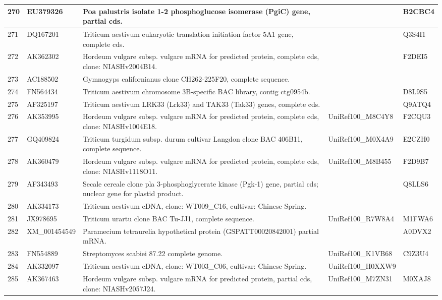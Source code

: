 \documentclass[10.9pt]{article} %
\begin{document}
{\begin{longtable}{|p{1.3cm}|p{1.8cm}|p{6.2cm}|p{3.8cm}|p{2cm}|}
\hline
270 & EU379326 & Poa palustris isolate 1-2 phosphoglucose isomerase (PgiC) gene, partial cds. &  & B2CBC4\\
\hline
271 & DQ167201 & Triticum aestivum eukaryotic translation initiation factor 5A1 gene, complete cds. &  & Q3S4I1\\
\hline
272 & AK362302 & Hordeum vulgare subsp. vulgare mRNA for predicted protein, complete cds, clone: NIASHv2004B14. &  & F2DEI5\\
\hline
273 & AC188502 & Gymnogyps californianus clone CH262-225F20, complete sequence. &  & \\
\hline
274 & FN564434 & Triticum aestivum chromosome 3B-specific BAC library, contig ctg0954b. &  & D8L9S5\\
\hline
275 & AF325197 & Triticum aestivum LRK33 (Lrk33) and TAK33 (Tak33) genes, complete cds. &  & Q9ATQ4\\
\hline
276 & AK353995 & Hordeum vulgare subsp. vulgare mRNA for predicted protein, complete cds, clone: NIASHv1004E18. & UniRef100\_M8C4Y8 & F2CQU3\\
\hline
277 & GQ409824 & Triticum turgidum subsp. durum cultivar Langdon clone BAC 406B11, complete sequence. & UniRef100\_M0X4A9 & E2CZH0\\
\hline
278 & AK360479 & Hordeum vulgare subsp. vulgare mRNA for predicted protein, complete cds, clone: NIASHv1118O11. & UniRef100\_M8B455 & F2D9B7\\
\hline
279 & AF343493 & Secale cereale clone pla 3-phosphoglycerate kinase (Pgk-1) gene, partial cds; nuclear gene for plastid product. &  & Q8LLS6\\
\hline
280 & AK334173 & Triticum aestivum cDNA, clone: WT009\_C16, cultivar: Chinese Spring. &  & \\
\hline
281 & JX978695 & Triticum urartu clone BAC Tu-JJ1, complete sequence. & UniRef100\_R7W8A4 & M1FWA6\\
\hline
282 & XM\_001454549 & Paramecium tetraurelia hypothetical protein (GSPATT00020842001) partial mRNA. &  & A0DVX2\\
\hline
283 & FN554889 & Streptomyces scabiei 87.22 complete genome. & UniRef100\_K1VB68 & C9Z3U4\\
\hline
284 & AK332097 & Triticum aestivum cDNA, clone: WT003\_C06, cultivar: Chinese Spring. & UniRef100\_H0XXW9 & \\
\hline
285 & AK367463 & Hordeum vulgare subsp. vulgare mRNA for predicted protein, partial cds, clone: NIASHv2057J24. & UniRef100\_M7ZN31 & M0XAJ8\\

\end{longtable}}
\end{document}
